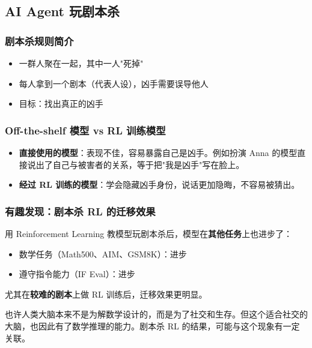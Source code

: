 \documentclass[12pt,a4paper]{article}
\begin{document}
\subsection{AI Agent 玩剧本杀}

\subsubsection{剧本杀规则简介}

\begin{itemize}[leftmargin=2em]
  \item 一群人聚在一起，其中一人"死掉"
  \item 每人拿到一个剧本（代表人设），凶手需要误导他人
  \item 目标：找出真正的凶手
\end{itemize}

\subsubsection{Off-the-shelf 模型 vs RL 训练模型}

\begin{itemize}[leftmargin=2em]
  \item \textbf{直接使用的模型}：表现不佳，容易暴露自己是凶手。例如扮演 Anna 的模型直接说出了自己与被害者的关系，等于把"我是凶手"写在脸上。
  \item \textbf{经过 RL 训练的模型}：学会隐藏凶手身份，说话更加隐晦，不容易被猜出。
\end{itemize}

\subsubsection{有趣发现：剧本杀 RL 的迁移效果}

用 Reinforcement Learning 教模型玩剧本杀后，模型在\textbf{其他任务}上也进步了：

\begin{itemize}[leftmargin=2em]
  \item 数学任务（Math500、AIM、GSM8K）：进步
  \item 遵守指令能力（IF Eval）：进步
\end{itemize}

尤其在\textbf{较难的剧本}上做 RL 训练后，迁移效果更明显。

\begin{myquote}
也许人类大脑本来不是为解数学设计的，而是为了社交和生存。但这个适合社交的大脑，也因此有了数学推理的能力。剧本杀 RL 的结果，可能与这个现象有一定关联。
\end{myquote}
\end{document}
